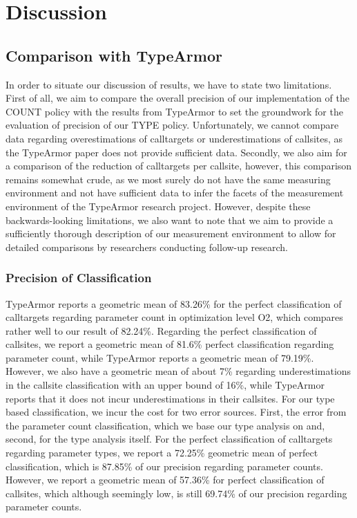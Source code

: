 
\section{Discussion}
\label{chapter:Discussion}

\subsection{Comparison with TypeArmor}
\label{section:comptype}
In order to situate our discussion of results, we have to state two limitations. First of all, we aim to compare the overall precision of our 
implementation of the COUNT policy with the results from TypeArmor to set the groundwork for the evaluation of precision of our TYPE policy. 
Unfortunately, we cannot compare data regarding overestimations of calltargets or underestimations of callsites, as the TypeArmor paper does 
not provide sufficient data. Secondly, we also aim for a comparison of the reduction of calltargets per callsite, however, this comparison 
remains somewhat crude, as we most surely do not have the same measuring environment and not have sufficient data to infer the facets of 
the measurement environment of the TypeArmor research project. However, despite these backwards-looking limitations, we also want to note 
that we aim to provide a sufficiently thorough description of our measurement environment to allow for detailed comparisons by researchers
conducting follow-up research.

\subsubsection{Precision of Classification}
TypeArmor reports a geometric mean of 83.26\% for the perfect classification of calltargets regarding parameter count in optimization level O2, 
which compares rather well to our result of 82.24\%. Regarding the perfect classification of callsites, we report a geometric mean of 81.6\% 
perfect classification regarding parameter count, while TypeArmor reports a geometric mean of 79.19\%. However, we also have a geometric mean 
of about 7\% regarding underestimations in the callsite classification with an upper
bound of 16\%, while TypeArmor reports that it does not incur underestimations in their callsites. For our type based classification, we 
incur the cost for two error sources. First, the error from the parameter count classification, which we base our type analysis on and, second, 
for the type analysis itself. For the perfect classification of calltargets regarding parameter types, we report a 72.25\% geometric mean of 
perfect classification, which is 87.85\% of our precision regarding parameter
counts. However, we report a geometric mean of 57.36\% for perfect classification of callsites, which although seemingly low, is still 69.74\% 
of our precision regarding parameter counts.

